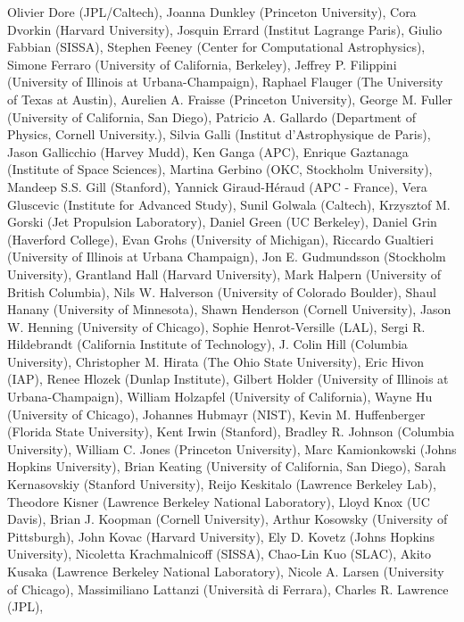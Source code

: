 Olivier Dore (JPL/Caltech),
Joanna Dunkley (Princeton University),
Cora Dvorkin (Harvard University),
Josquin Errard (Institut Lagrange Paris),
Giulio Fabbian (SISSA),
Stephen Feeney (Center for Computational Astrophysics),
Simone Ferraro (University of California, Berkeley),
Jeffrey P. Filippini (University of Illinois at Urbana-Champaign),
Raphael Flauger (The University of Texas at Austin),
Aurelien A. Fraisse (Princeton University),
George M. Fuller (University of California, San Diego),
Patricio A. Gallardo (Department of Physics, Cornell University.),
Silvia Galli (Institut d'Astrophysique de Paris),
Jason Gallicchio (Harvey Mudd),
Ken Ganga (APC),
Enrique Gaztanaga (Institute of Space Sciences),
Martina Gerbino (OKC, Stockholm University),
Mandeep S.S. Gill (Stanford),
Yannick Giraud-Héraud (APC - France),
Vera Gluscevic (Institute for Advanced Study),
Sunil Golwala (Caltech),
Krzysztof M. Gorski (Jet Propulsion Laboratory),
Daniel Green (UC Berkeley),
Daniel Grin (Haverford College),
Evan Grohs (University of Michigan),
Riccardo Gualtieri (University of Illinois at Urbana Champaign),
Jon E. Gudmundsson (Stockholm University),
Grantland Hall (Harvard University),
Mark Halpern (University of British Columbia),
Nils W. Halverson (University of Colorado Boulder),
Shaul Hanany (University of Minnesota),
Shawn Henderson (Cornell University),
Jason W. Henning (University of Chicago),
Sophie Henrot-Versille (LAL),
Sergi R. Hildebrandt (California Institute of Technology),
J. Colin Hill (Columbia University),
Christopher M. Hirata (The Ohio State University),
Eric Hivon (IAP),
Renee Hlozek (Dunlap Institute),
Gilbert Holder (University of Illinois at Urbana-Champaign),
William Holzapfel (University of California),
Wayne Hu (University of Chicago),
Johannes Hubmayr (NIST),
Kevin M. Huffenberger (Florida State University),
Kent Irwin (Stanford),
Bradley R. Johnson (Columbia University),
William C. Jones (Princeton University),
Marc Kamionkowski (Johns Hopkins University),
Brian Keating (University of California, San Diego),
Sarah Kernasovskiy (Stanford University),
Reijo Keskitalo (Lawrence Berkeley Lab),
Theodore Kisner (Lawrence Berkeley National Laboratory),
Lloyd Knox (UC Davis),
Brian J. Koopman (Cornell University),
Arthur Kosowsky (University of Pittsburgh),
John Kovac (Harvard University),
Ely D. Kovetz (Johns Hopkins University),
Nicoletta Krachmalnicoff (SISSA),
Chao-Lin Kuo (SLAC),
Akito Kusaka (Lawrence Berkeley National Laboratory),
Nicole A. Larsen (University of Chicago),
Massimiliano Lattanzi (Università di Ferrara),
Charles R. Lawrence (JPL),

